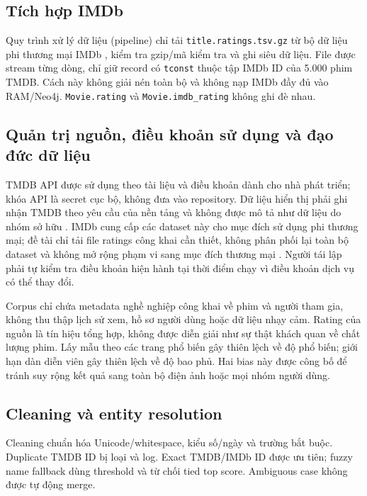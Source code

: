 \subsection{Tích hợp IMDb}

Quy trình xử lý dữ liệu (pipeline) chỉ tải \texttt{title.ratings.tsv.gz} từ bộ dữ
liệu phi thương mại IMDb \cite{imdb2026datasets}, kiểm tra gzip/mã kiểm tra và
ghi siêu dữ liệu.
File được stream từng dòng, chỉ giữ record có \texttt{tconst} thuộc tập IMDb ID của 5.000
phim TMDB. Cách này không giải nén toàn bộ và không nạp IMDb đầy đủ vào RAM/Neo4j.
\texttt{Movie.rating} và \texttt{Movie.imdb\_rating} không ghi đè nhau.

\subsection{Quản trị nguồn, điều khoản sử dụng và đạo đức dữ liệu}

TMDB API được sử dụng theo tài liệu và điều khoản dành cho nhà phát triển; khóa
API là secret cục bộ, không đưa vào repository. Dữ liệu hiển thị phải ghi nhận
TMDB theo yêu cầu của nền tảng và không được mô tả như dữ liệu do nhóm sở hữu \cite{tmdb2026api}.
IMDb cung cấp các dataset này cho mục đích sử dụng phi thương mại; đề tài chỉ tải
file ratings công khai cần thiết, không phân phối lại toàn bộ dataset và không
mở rộng phạm vi sang mục đích thương mại \cite{imdb2026datasets}. Người tái lập phải tự kiểm tra điều
khoản hiện hành tại thời điểm chạy vì điều khoản dịch vụ có thể thay đổi.

Corpus chỉ chứa metadata nghề nghiệp công khai về phim và người tham gia, không
thu thập lịch sử xem, hồ sơ người dùng hoặc dữ liệu nhạy cảm. Rating của nguồn là
tín hiệu tổng hợp, không được diễn giải như sự thật khách quan về chất lượng phim.
Lấy mẫu theo các trang phổ biến gây thiên lệch về độ phổ biến; giới hạn dàn diễn
viên gây thiên lệch về độ bao phủ.
Hai bias này được công bố để tránh suy rộng kết quả sang toàn bộ điện ảnh hoặc
mọi nhóm người dùng.

\subsection{Cleaning và entity resolution}

Cleaning chuẩn hóa Unicode/whitespace, kiểu số/ngày và trường bắt buộc. Duplicate
TMDB ID bị loại và log. Exact TMDB/IMDb ID được ưu tiên; fuzzy name fallback dùng
threshold và từ chối tied top score. Ambiguous case không được tự động merge.

